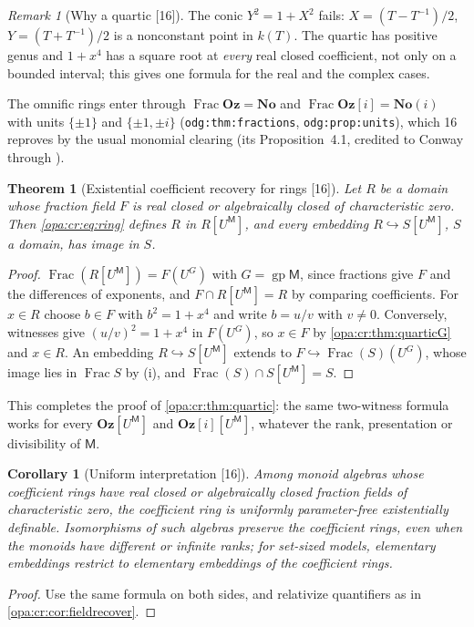\documentclass[11pt,oneside]{article}
\numberwithin{equation}{section}
\newtheorem{theorem}{Theorem}[section]
\newtheorem{corollary}[corollary]{Corollary}
\theoremstyle{definition}
\theoremstyle{remark}
\newtheorem{remark}[remark]{Remark}
\newcommand{\No}{\mathbf{No}}
\newcommand{\Oz}{\mathbf{Oz}}
\newcommand{\Og}{\mathbf{Oz}[i]}
\newcommand{\SC}{\mathbf{No}(i)}
\newcommand{\Frac}{\operatorname{Frac}}
\newcommand{\src}[1]{\textup{\textsf{\small[#1]}}}
\newcommand{\lbl}[1]{\nolinkurl{#1}}
\begin{document}
\begin{remark}[Why a quartic \src{16}]\label{opa:cr:rem:conic}
The conic $Y^2=1+X^2$ fails: $X=(T-T^{-1})/2$, $Y=(T+T^{-1})/2$ is a nonconstant point in $k(T)$. The quartic
has positive genus and $1+x^4$ has a square root at \emph{every} real closed coefficient, not only on a
bounded interval; this gives one formula for the real and the complex cases.
\end{remark}

The omnific rings enter through $\Frac\Oz=\No$ and $\Frac\Og=\SC$ with units $\{\pm1\}$ and $\{\pm1,\pm i\}$
(\lbl{odg:thm:fractions}, \lbl{odg:prop:units}), which 16 reproves by the usual monomial clearing (its
Proposition~4.1, credited to Conway through \cite[Proposition 2.4.5]{LM}).

\begin{theorem}[Existential coefficient recovery for rings \src{16}]\label{opa:cr:thm:ringrecover}
Let $R$ be a domain whose fraction field $F$ is real closed or algebraically closed of characteristic zero. Then
\eqref{opa:cr:eq:ring} defines $R$ in $R[U^{\mathsf M}]$, and every embedding $R\hookrightarrow S[U^{\mathsf M}]$, $S$ a
domain, has image in $S$.
\end{theorem}
\begin{proof}
$\Frac(R[U^{\mathsf M}])=F(U^G)$ with $G=\operatorname{gp}\mathsf M$, since fractions give $F$ and the differences
of exponents, and $F\cap R[U^{\mathsf M}]=R$ by comparing coefficients. For $x\in R$ choose $b\in F$ with
$b^2=1+x^4$ and write $b=u/v$ with $v\ne0$. Conversely, witnesses give $(u/v)^2=1+x^4$ in $F(U^G)$, so $x\in F$ by
\cref{opa:cr:thm:quarticG} and $x\in R$. An embedding $R\hookrightarrow S[U^{\mathsf M}]$ extends to
$F\hookrightarrow\Frac(S)(U^G)$, whose image lies in $\Frac S$ by (i), and $\Frac(S)\cap S[U^{\mathsf M}]=S$.
\end{proof}

This completes the proof of \cref{opa:cr:thm:quartic}: the same two-witness formula works for every
$\Oz[U^{\mathsf M}]$ and $\Og[U^{\mathsf M}]$, whatever the rank, presentation or divisibility of $\mathsf M$.

\begin{corollary}[Uniform interpretation \src{16}]\label{opa:cr:cor:interpretation}
Among monoid algebras whose coefficient rings have real closed or algebraically closed fraction fields of
characteristic zero, the coefficient ring is uniformly parameter-free existentially definable. Isomorphisms of
such algebras preserve the coefficient rings, even when the monoids have different or infinite ranks; for
set-sized models, elementary embeddings restrict to elementary embeddings of the coefficient rings.
\end{corollary}
\begin{proof}
Use the same formula on both sides, and relativize quantifiers as in \cref{opa:cr:cor:fieldrecover}.
\end{proof}
\end{document}
